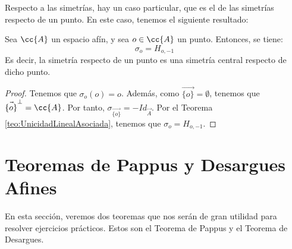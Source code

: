 Respecto a las simetrías, hay un caso particular, que es el de las simetrías respecto de un punto. En este caso, tenemos el siguiente resultado:
\begin{prop}\label{lema:SimetriaCentral}
    Sea $\cc{A}$ un espacio afín, y sea $o\in \cc{A}$ un punto. Entonces, se tiene:
    \begin{equation*}
        \sigma_{o} = H_{o,-1}
    \end{equation*}
    Es decir, la simetría respecto de un punto es una simetría central respecto de dicho punto.
\end{prop}
\begin{proof}
    Tenemos que $\sigma_{o}(o) = o$. Además, como $\vec{\{o\}} = \emptyset$, tenemos que $\vec{\{o\}}^\perp=\cc{A}$. Por tanto,
    $\sigma_{\vec{\{o\}}}=-Id_{\vec{A}}$. Por el Teorema \ref{teo:UnicidadLinealAsociada}, tenemos que $\sigma_{o} = H_{o,-1}$.
\end{proof}




\section{Teoremas de Pappus y Desargues Afines}\label{sec:TeoremasPappusDesarguesAfines}
En esta sección, veremos dos teoremas que nos serán de gran utilidad para resolver ejercicios prácticos. Estos son el Teorema de Pappus y el Teorema de Desargues.

